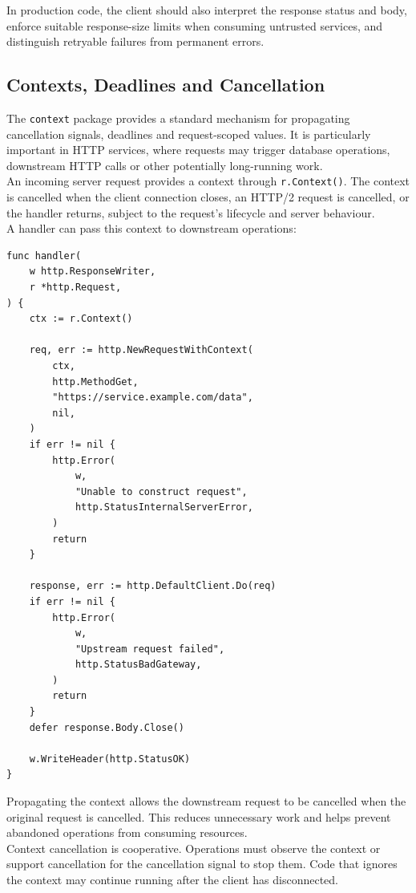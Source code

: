 In production code, the client should also interpret the response status and body, enforce suitable response-size limits when consuming untrusted services, and distinguish retryable failures from permanent errors.

\subsection{Contexts, Deadlines and Cancellation}

The \texttt{context} package provides a standard mechanism for propagating cancellation signals, deadlines and request-scoped values. It is particularly important in HTTP services, where requests may trigger database operations, downstream HTTP calls or other potentially long-running work.\\

An incoming server request provides a context through \texttt{r.Context()}. The context is cancelled when the client connection closes, an HTTP/2 request is cancelled, or the handler returns, subject to the request's lifecycle and server behaviour.\\

A handler can pass this context to downstream operations:

\begin{lstlisting}
func handler(
    w http.ResponseWriter,
    r *http.Request,
) {
    ctx := r.Context()

    req, err := http.NewRequestWithContext(
        ctx,
        http.MethodGet,
        "https://service.example.com/data",
        nil,
    )
    if err != nil {
        http.Error(
            w,
            "Unable to construct request",
            http.StatusInternalServerError,
        )
        return
    }

    response, err := http.DefaultClient.Do(req)
    if err != nil {
        http.Error(
            w,
            "Upstream request failed",
            http.StatusBadGateway,
        )
        return
    }
    defer response.Body.Close()

    w.WriteHeader(http.StatusOK)
}
\end{lstlisting}

Propagating the context allows the downstream request to be cancelled when the original request is cancelled. This reduces unnecessary work and helps prevent abandoned operations from consuming resources.\\

Context cancellation is cooperative. Operations must observe the context or support cancellation for the cancellation signal to stop them. Code that ignores the context may continue running after the client has disconnected.\\

